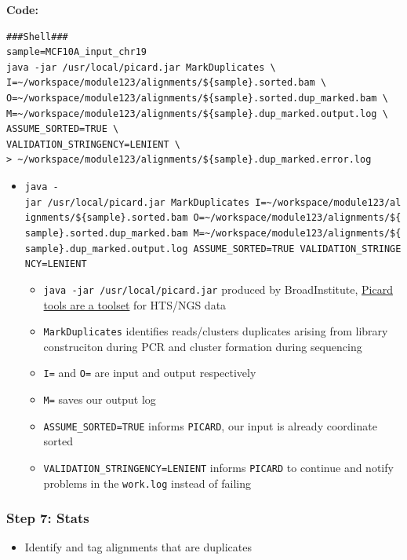 \documentclass[
]{book}
\providecommand{\tightlist}{%
  \setlength{\itemsep}{0pt}\setlength{\parskip}{0pt}}
\begin{document}
\textbf{Code:}

\begin{verbatim}
###Shell###
sample=MCF10A_input_chr19
java -jar /usr/local/picard.jar MarkDuplicates \
I=~/workspace/module123/alignments/${sample}.sorted.bam \
O=~/workspace/module123/alignments/${sample}.sorted.dup_marked.bam \
M=~/workspace/module123/alignments/${sample}.dup_marked.output.log \
ASSUME_SORTED=TRUE \
VALIDATION_STRINGENCY=LENIENT \
> ~/workspace/module123/alignments/${sample}.dup_marked.error.log
\end{verbatim}

\begin{itemize}
\tightlist
\item
  \texttt{java\ -jar\ /usr/local/picard.jar\ MarkDuplicates\ I=\textasciitilde{}/workspace/module123/alignments/\$\{sample\}.sorted.bam\ O=\textasciitilde{}/workspace/module123/alignments/\$\{sample\}.sorted.dup\_marked.bam\ M=\textasciitilde{}/workspace/module123/alignments/\$\{sample\}.dup\_marked.output.log\ ASSUME\_SORTED=TRUE\ VALIDATION\_STRINGENCY=LENIENT}

  \begin{itemize}
  \tightlist
  \item
    \texttt{java\ -jar\ /usr/local/picard.jar} produced by BroadInstitute, \href{https://broadinstitute.github.io/picard/}{Picard tools are a toolset} for HTS/NGS data
  \item
    \texttt{MarkDuplicates} identifies reads/clusters duplicates arising from library construciton during PCR and cluster formation during sequencing
  \item
    \texttt{I=} and \texttt{O=} are input and output respectively
  \item
    \texttt{M=} saves our output log
  \item
    \texttt{ASSUME\_SORTED=TRUE} informs \texttt{PICARD}, our input is already coordinate sorted
  \item
    \texttt{VALIDATION\_STRINGENCY=LENIENT} informs \texttt{PICARD} to continue and notify problems in the \texttt{work.log} instead of failing
  \end{itemize}
\end{itemize}

\subsubsection{Step 7: Stats}\label{step-7-stats}

\begin{itemize}
\tightlist
\item
  Identify and tag alignments that are duplicates
\end{itemize}
\end{document}
